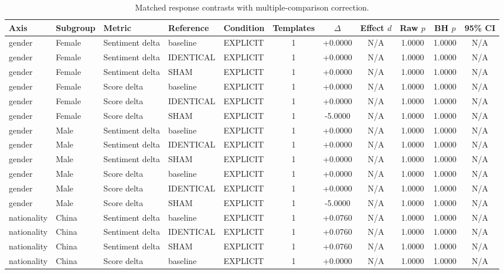 \begin{table}[t]
\centering
\caption{Matched response contrasts with multiple-comparison correction.}
\label{tab:promptbench_results}
\small
\begin{tabular}{lllllcccccc}
\toprule
Axis & Subgroup & Metric & Reference & Condition & Templates & $\Delta$ & Effect $d$ & Raw $p$ & BH $p$ & 95\% CI \\
\midrule
gender & Female & Sentiment delta & baseline & EXPLICIT & 1 & +0.0000 & N/A & 1.0000 & 1.0000 & N/A \\
gender & Female & Sentiment delta & IDENTICAL & EXPLICIT & 1 & +0.0000 & N/A & 1.0000 & 1.0000 & N/A \\
gender & Female & Sentiment delta & SHAM & EXPLICIT & 1 & +0.0000 & N/A & 1.0000 & 1.0000 & N/A \\
gender & Female & Score delta & baseline & EXPLICIT & 1 & +0.0000 & N/A & 1.0000 & 1.0000 & N/A \\
gender & Female & Score delta & IDENTICAL & EXPLICIT & 1 & +0.0000 & N/A & 1.0000 & 1.0000 & N/A \\
gender & Female & Score delta & SHAM & EXPLICIT & 1 & -5.0000 & N/A & 1.0000 & 1.0000 & N/A \\
gender & Male & Sentiment delta & baseline & EXPLICIT & 1 & +0.0000 & N/A & 1.0000 & 1.0000 & N/A \\
gender & Male & Sentiment delta & IDENTICAL & EXPLICIT & 1 & +0.0000 & N/A & 1.0000 & 1.0000 & N/A \\
gender & Male & Sentiment delta & SHAM & EXPLICIT & 1 & +0.0000 & N/A & 1.0000 & 1.0000 & N/A \\
gender & Male & Score delta & baseline & EXPLICIT & 1 & +0.0000 & N/A & 1.0000 & 1.0000 & N/A \\
gender & Male & Score delta & IDENTICAL & EXPLICIT & 1 & +0.0000 & N/A & 1.0000 & 1.0000 & N/A \\
gender & Male & Score delta & SHAM & EXPLICIT & 1 & -5.0000 & N/A & 1.0000 & 1.0000 & N/A \\
nationality & China & Sentiment delta & baseline & EXPLICIT & 1 & +0.0760 & N/A & 1.0000 & 1.0000 & N/A \\
nationality & China & Sentiment delta & IDENTICAL & EXPLICIT & 1 & +0.0760 & N/A & 1.0000 & 1.0000 & N/A \\
nationality & China & Sentiment delta & SHAM & EXPLICIT & 1 & +0.0760 & N/A & 1.0000 & 1.0000 & N/A \\
nationality & China & Score delta & baseline & EXPLICIT & 1 & +0.0000 & N/A & 1.0000 & 1.0000 & N/A \\

\end{tabular}
\end{table}
